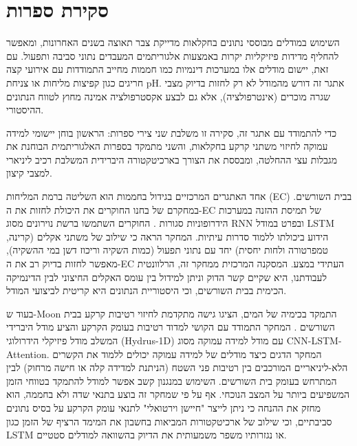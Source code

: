 \section{סקירת ספרות}

השימוש במודלים מבוססי נתונים  בחקלאות מדייקת צבר תאוצה בשנים האחרונות, ומאפשר להחליף מדידות פיזיקליות יקרות באמצעות אלגוריתמים המעבדים נתוני סביבה ותפעול. עם זאת, יישום מודלים אלו במערכות דינמיות כמו חממות מחייב התמודדות עם אירועי קצה חריגים כגון קפיצות מליחות או צניחת pH. אתגר זה דורש מהמודל לא רק לחזות בדיוק מצבי שגרה מוכרים (אינטרפולציה), אלא גם לבצע אקסטרפולציה אמינה מחוץ לטווח הנתונים ההיסטורי.

כדי להתמודד עם אתגר זה, סקירה זו משלבת שני צירי ספרות: הראשון בוחן יישומי למידה עמוקה לחיזוי משתני קרקע בחקלאות, והשני מתמקד בספרות האלגוריתמית הבוחנת את מגבלות עצי ההחלטה, ומבססת את הצורך בארכיטקטורה היברידית המשלבת רכיב ליניארי למצבי קיצון.

אחד האתגרים המרכזיים בגידול בחממות הוא השליטה ברמת המליחות (EC) בבית השורשים. במחקרם של  בחנו החוקרים את היכולת לחזות את ה-EC של תמיסת ההזנה במערכות הידרופוניות סגורות . החוקרים השתמשו ברשת נוירונים מסוג RNN  ובפרט במודל LSTM הידוע ביכולתו ללמוד סדרות עיתיות. המחקר הראה כי שילוב של משתני אקלים (קרינה, טמפרטורה ולחות יחסית) יחד עם נתוני תפעול (כמות השקיה וריכוז דשן במי ההשקיה), מאפשר לחזות בדיוק רב את ה-EC העתידי במצע. המסקנה המרכזית ממחקר זה, הרלוונטית לעבודתנו, היא שקיים קשר הדוק וניתן למידול בין עומס האקלים החיצוני לבין הדינמיקה הכימית בבית השורשים, וכי היסטוריית הנתונים  היא קריטית לביצועי המודל.

בעוד ש-Moon התמקד בכימיה של המים,  הציגו גישה מתקדמת לחיזוי רטיבות קרקע בבית השורשים . המחקר התמודד עם הקושי למדוד רטיבות בעומק הקרקע והציע מודל היברידי המשלב מודל פיזיקלי הידרולוגי (Hydrus-1D) עם מודל למידה עמוקה מסוג CNN-LSTM-Attention. המחקר הדגים כיצד מודלים של למידה עמוקה  יכולים ללמוד את הקשרים הלא-ליניאריים המורכבים בין רטיבות פני השטח (הניתנת למדידה קלה או חישה מרחוק) לבין המתרחש בעומק בית השורשים. השימוש במנגנון קשב  אפשר למודל להתמקד בטווחי הזמן המשפיעים ביותר על המצב הנוכחי. אף על פי שמחקר זה בוצע בתנאי שדה  ולא בחממה, הוא מחזק את ההנחה כי ניתן לייצר "חיישן וירטואלי" לתנאי עומק הקרקע על בסיס נתונים סביבתיים, וכי שילוב של ארכיטקטורות המביאות בחשבון את המימד הרציף של הזמן כגון LSTM או נגזרותיו משפר משמעותית את הדיוק בהשוואה למודלים סטטיים.

